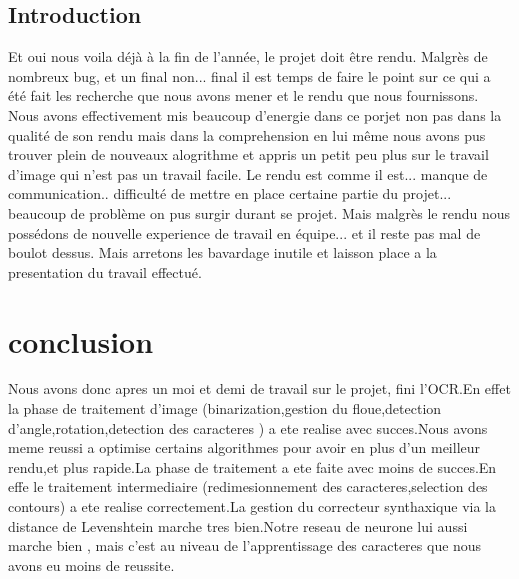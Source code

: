 \documentclass[12pt]{article}
\begin{document}
\subsection{Introduction}
Et oui nous voila déjà à la fin de l'année, le projet doit être rendu. Malgrès de nombreux bug, et un final non... final il est temps de faire le point sur ce qui a été fait les recherche que nous avons mener et le rendu que nous fournissons. Nous avons effectivement mis beaucoup d'energie dans ce porjet non pas dans la qualité de son rendu mais dans la comprehension en lui même nous avons pus trouver plein de nouveaux alogrithme et appris un petit peu plus sur le travail d'image qui n'est pas un travail facile. Le rendu est comme il est... manque de communication.. difficulté de mettre en place certaine partie du projet... beaucoup de problème on pus surgir durant se projet. Mais malgrès le rendu nous possédons de nouvelle experience de travail en équipe... et il reste pas mal de boulot dessus. Mais arretons les bavardage inutile et laisson place a la presentation du travail effectué.






\section{conclusion}
Nous avons donc apres un moi et demi de travail sur le projet, fini l'OCR.En effet la phase de traitement d'image (binarization,gestion du floue,detection d'angle,rotation,detection des caracteres ) a ete realise avec succes.Nous avons meme reussi a optimise certains algorithmes pour avoir en plus d'un meilleur rendu,et plus rapide.La phase de traitement a ete faite avec moins de succes.En effe le traitement intermediaire (redimesionnement des caracteres,selection des contours) a ete realise correctement.La gestion du correcteur synthaxique via la distance de Levenshtein  marche tres bien.Notre reseau de neurone lui aussi marche bien , mais c'est au niveau de l'apprentissage des caracteres que nous avons eu moins de reussite.
\end{document}
